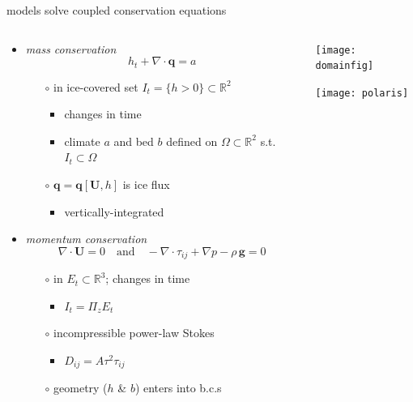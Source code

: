 \documentclass[xcolor={dvipsnames}]{beamer}
\newcommand\bq{\mathbf{q}}
\newcommand\bU{\mathbf{U}}
\newcommand\RR{\mathbb{R}}
\newcommand\Div{\nabla\cdot}
\begin{document}
\begin{frame}{models solve coupled conservation equations}

\begin{columns}
\begin{column}{0.7\textwidth}
\begin{itemize}
\small
\item \emph{mass conservation}
\begin{equation*}
h_t + \Div\bq = a
\end{equation*}
    \begin{itemize}
    \footnotesize
    \vspace{-5mm}
    \item[$\circ$] in ice-covered set $I_t = \{h>0\} \subset \RR^2$
        \begin{itemize}
        \item changes in time
        \item climate $a$ and bed $b$ defined on $\Omega\subset \RR^2$ s.t.~$I_t\subset\Omega$
        \end{itemize}
    \item[$\circ$] $\bq=\bq[\bU,h]$ is ice flux
        \begin{itemize}
        \item vertically-integrated
        \end{itemize} 
    \end{itemize}
\item \emph{momentum conservation}
\begin{equation*}
  \nabla \cdot \bU = 0 \quad \text{and} \quad - \nabla \cdot \tau_{ij} + \nabla p - \rho\, \mathbf{g} = 0
\end{equation*}
    \begin{itemize}
    \footnotesize
    \vspace{-5mm}
    \item[$\circ$] in $E_t \subset \RR^3$; changes in time
        \begin{itemize}
        \item $I_t = \Pi_z E_t$
        \end{itemize}
    \item[$\circ$] incompressible power-law Stokes
        \begin{itemize}
        \item $D_{ij} = A \tau^{2} \tau_{ij}$
        \end{itemize}
    \item[$\circ$] geometry ($h$ \& $b$) enters into b.c.s
    \end{itemize}
\end{itemize}
\end{column}
\begin{column}{0.3\textwidth}
\texttt{[image: domainfig]}

\vspace{0.5in}
\texttt{[image: polaris]}
\end{column}
\end{columns}
\end{frame}
\end{document}
